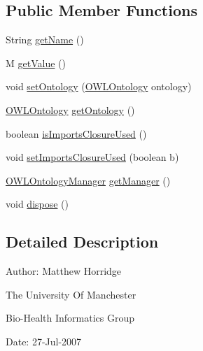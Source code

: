 \subsection*{Public Member Functions}
\begin{DoxyCompactItemize}
\item 
String \hyperlink{interfaceorg_1_1semanticweb_1_1owlapi_1_1metrics_1_1_o_w_l_metric_3_01_m_01_4_a2bf46b53dac8e60a31442bf46b2933a9}{get\-Name} ()
\item 
M \hyperlink{interfaceorg_1_1semanticweb_1_1owlapi_1_1metrics_1_1_o_w_l_metric_3_01_m_01_4_a875b24183291649a805fe49b73b93af8}{get\-Value} ()
\item 
void \hyperlink{interfaceorg_1_1semanticweb_1_1owlapi_1_1metrics_1_1_o_w_l_metric_3_01_m_01_4_a01d38442080ecb44c5d913b053a20469}{set\-Ontology} (\hyperlink{interfaceorg_1_1semanticweb_1_1owlapi_1_1model_1_1_o_w_l_ontology}{O\-W\-L\-Ontology} ontology)
\item 
\hyperlink{interfaceorg_1_1semanticweb_1_1owlapi_1_1model_1_1_o_w_l_ontology}{O\-W\-L\-Ontology} \hyperlink{interfaceorg_1_1semanticweb_1_1owlapi_1_1metrics_1_1_o_w_l_metric_3_01_m_01_4_a1c3359b061237c78123264f4d8273e57}{get\-Ontology} ()
\item 
boolean \hyperlink{interfaceorg_1_1semanticweb_1_1owlapi_1_1metrics_1_1_o_w_l_metric_3_01_m_01_4_ae3f1a381328e8e98788ec3d41a8e2fae}{is\-Imports\-Closure\-Used} ()
\item 
void \hyperlink{interfaceorg_1_1semanticweb_1_1owlapi_1_1metrics_1_1_o_w_l_metric_3_01_m_01_4_a03337a673dc761335f8987965130a762}{set\-Imports\-Closure\-Used} (boolean b)
\item 
\hyperlink{interfaceorg_1_1semanticweb_1_1owlapi_1_1model_1_1_o_w_l_ontology_manager}{O\-W\-L\-Ontology\-Manager} \hyperlink{interfaceorg_1_1semanticweb_1_1owlapi_1_1metrics_1_1_o_w_l_metric_3_01_m_01_4_a4063f1c9d6ed73a04a964e434f0c9a67}{get\-Manager} ()
\item 
void \hyperlink{interfaceorg_1_1semanticweb_1_1owlapi_1_1metrics_1_1_o_w_l_metric_3_01_m_01_4_a86f5b6832be5abd7b5db9d47ab3f8b3f}{dispose} ()
\end{DoxyCompactItemize}


\subsection{Detailed Description}
Author\-: Matthew Horridge\par
 The University Of Manchester\par
 Bio-\/\-Health Informatics Group\par
 Date\-: 27-\/\-Jul-\/2007\par
\par
 


